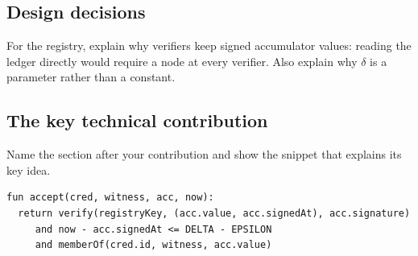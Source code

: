 \subsection{Design decisions}\label{guide:chapters:design-decisions}
For the registry, explain why verifiers keep signed accumulator values: reading the ledger directly would require a node at every verifier. Also explain why $\delta$ is a parameter rather than a constant.

\subsection[The key technical contribution]{The key technical contribution\skimmark}\label{guide:chapters:key-contribution}
Name the section after your contribution and show the snippet that explains its key idea.
\begin{lstlisting}[float=htbp, caption={The verifier authenticates the value and timestamp, reserves $\epsilon$ of the staleness budget for clock error, and checks the membership witness. Here $0\leq\epsilon<\delta$.}, label={guide:lst:key}]
fun accept(cred, witness, acc, now):
  return verify(registryKey, (acc.value, acc.signedAt), acc.signature)
     and now - acc.signedAt <= DELTA - EPSILON
     and memberOf(cred.id, witness, acc.value)
\end{lstlisting}

